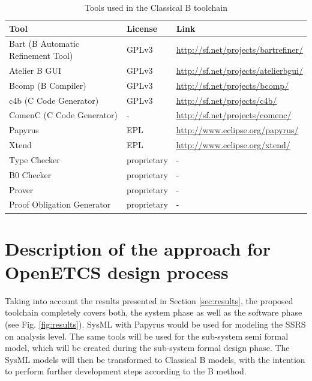 \begin{center}
\begin{table}
  \begin{tabular}{ l | l | l }
    Tool                               & License & Link \\ 
    \hline \hline
    Bart (B Automatic Refinement Tool) & GPLv3 & \url{http://sf.net/projects/bartrefiner/} \\ \hline
    Atelier B GUI                      & GPLv3 & \url{http://sf.net/projects/atelierbgui/} \\ \hline
    Bcomp (B Compiler)                 & GPLv3 & \url{http://sf.net/projects/bcomp/} \\ \hline
    c4b (C Code Generator)             & GPLv3 & \url{http://sf.net/projects/c4b/} \\ \hline
    ComenC (C Code Generator)          & -     & \url{http://sf.net/projects/comenc/} \\ \hline
    Papyrus                            & EPL   & \url{http://www.eclipse.org/papyrus/} \\ \hline
    Xtend                              & EPL   & \url{http://www.eclipse.org/xtend/} \\ \hline
    Type Checker                       & proprietary & - \\ \hline
    B0 Checker                         & proprietary & - \\ \hline
    Prover                             & proprietary & - \\ \hline
    Proof Obligation Generator         & proprietary & - \\ \hline
    \hline
  \end{tabular}
  \caption{Tools used in the Classical B toolchain}
  \label{tab:classical-b-tools}
\end{table}
\end{center}



\section{Description of the approach for OpenETCS design process}

Taking into account the results presented in Section
\ref{sec:results}, the proposed toolchain completely covers both, the
system phase as well as the software phase (see
Fig. \ref{fig:results}). SysML with Papyrus would be used for modeling
the SSRS on analysis level. The same tools will be used for the
sub-system semi formal model, which will be created during the
sub-system formal design phase. The SysML models will then be
transformed to Classical B models, with the intention to perform
further development steps according to the B method.

